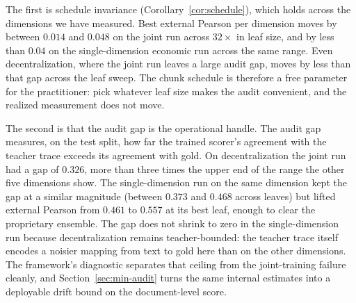 The first is schedule invariance (Corollary~\ref{cor:schedule}),
which holds across the dimensions we have measured. Best external
Pearson per dimension moves by between $0.014$ and $0.048$ on the
joint run across $32\times$ in leaf size, and by less than $0.04$
on the single-dimension economic run across the same range. Even
decentralization, where the joint run leaves a large audit gap,
moves by less than that gap across the leaf sweep. The chunk
schedule is therefore a free parameter for the practitioner: pick
whatever leaf size makes the audit convenient, and the realized
measurement does not move.

The second is that the audit gap is the operational handle. The
audit gap measures, on the test split, how far the trained
scorer's agreement with the teacher trace exceeds its agreement
with gold. On decentralization the joint run had a gap of $0.326$,
more than three times the upper end of the range the other five
dimensions show. The single-dimension run on the same dimension
kept the gap at a similar magnitude (between $0.373$ and $0.468$
across leaves) but lifted external Pearson from $0.461$ to $0.557$
at its best leaf, enough to clear the proprietary ensemble. The gap does not shrink to zero in the
single-dimension run because decentralization remains
teacher-bounded: the teacher trace itself encodes a noisier
mapping from text to gold here than on the other dimensions. The
framework's diagnostic separates that ceiling from the
joint-training failure cleanly, and Section~\ref{sec:min-audit}
turns the same internal estimates into a deployable drift bound on
the document-level score.
